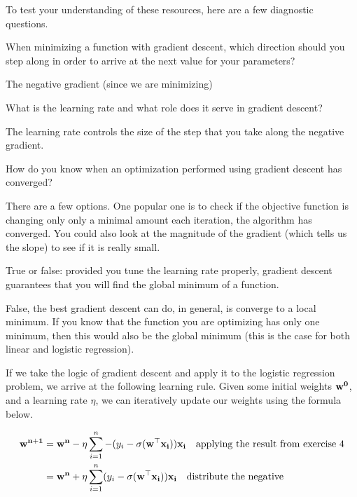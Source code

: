 \documentclass[assignment04_Solutions]{subfiles}
\begin{document}
\begin{exercise}[(10 minutes)]
To test your understanding of these resources, here are a few diagnostic questions.
\bes
\item When minimizing a function with gradient descent, which direction should you step along in order to arrive at the next value for your parameters?
\begin{boxedsolution}
The negative gradient (since we are minimizing)
\end{boxedsolution}

\item What is the learning rate and what role does it serve in gradient descent?
\begin{boxedsolution}
The learning rate controls the size of the step that you take along the negative gradient.
\end{boxedsolution}

\item How do you know when an optimization performed using gradient descent has converged?
\begin{boxedsolution}
There are a few options.  One popular one is to check if the objective function is changing only only a minimal amount each iteration, the algorithm has converged.  You could also look at the magnitude of the gradient (which tells us the slope) to see if it is really small.
\end{boxedsolution}

\item True or false: provided you tune the learning rate properly, gradient descent guarantees that you will find the global minimum of a function.
\begin{boxedsolution}
False, the best gradient descent can do, in general, is converge to a local minimum.  If you know that the function you are optimizing has only one minimum, then this would also be the global minimum (this is the case for both linear and logistic regression).
\end{boxedsolution}
\ees
\end{exercise}

If we take the logic of gradient descent and apply it to the logistic regression problem, we arrive at the following learning rule.  Given some initial weights $\mathbf{w^0}$, and a learning rate $\eta$, we can iteratively update our weights using the formula below.

\begin{align}
\mathbf{w^{n+1}} &= \mathbf{w^n} - \eta \sum_{i=1}^n  -(y_i - \sigma(\mathbf{w}^\top \mathbf{x_i})) \mathbf{x_i} ~~~\mbox{applying the result from exercise 4} \\
&=  \mathbf{w^n} + \eta \sum_{i=1}^n  (y_i - \sigma(\mathbf{w}^\top \mathbf{x_i})) \mathbf{x_i}  ~~~\mbox{distribute the negative}
\end{align}
\end{document}
